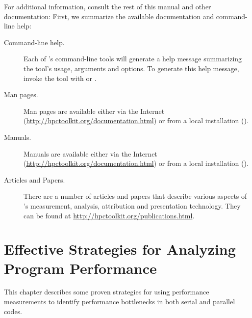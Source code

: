 \documentclass[11pt,letterpaper]{report}
\begin{document}
For additional information, consult the rest of this manual and other documentation:
First, we summarize the available documentation and command-line help:

\begin{description}

\item[Command-line help.]\hfill

Each of \HPCToolkit{}'s command-line tools will generate a help message summarizing the tool's usage, arguments and options.
To generate this help message, invoke the tool with  or .

\item[Man pages.]\hfill

Man pages are available either via the Internet (\url{http://hpctoolkit.org/documentation.html}) or from a local \HPCToolkit{} installation ().

\item[Manuals.]\hfill

Manuals are available either via the Internet (\url{http://hpctoolkit.org/documentation.html}) or from a local \HPCToolkit{} installation ().

\item[Articles and Papers.]\hfill

There are a number of articles and papers that describe various aspects of \HPCToolkit{}'s measurement, analysis, attribution and presentation technology.
They can be found at \url{http://hpctoolkit.org/publications.html}.

\end{description}



\chapter{Effective Strategies for Analyzing Program Performance}
\label{chpt:effective-performance-analysis}

This chapter describes some proven strategies for using performance measurements to identify performance bottlenecks in both serial and parallel codes.


\end{document}
